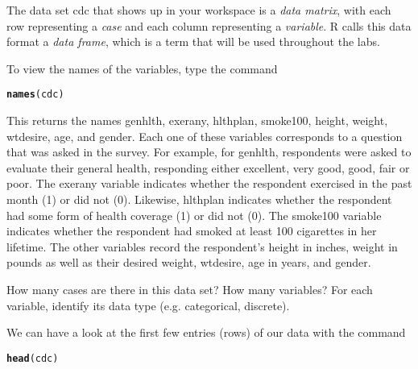 \documentclass{article}\usepackage[]{graphicx}\usepackage[]{color}
\makeatletter
\newcommand{\hlstd}[1]{\textcolor[rgb]{0.345,0.345,0.345}{#1}}%
\newcommand{\hlkwd}[1]{\textcolor[rgb]{0.737,0.353,0.396}{\textbf{#1}}}%
\newenvironment{kframe}{%
 \def\at@end@of@kframe{}%
 \ifinner\ifhmode%
  \def\at@end@of@kframe{\end{minipage}}%
  \begin{minipage}{\columnwidth}%
 \fi\fi%
 \def\FrameCommand##1{\hskip\@totalleftmargin \hskip-\fboxsep
 \colorbox{shadecolor}{##1}\hskip-\fboxsep
     \hskip-\linewidth \hskip-\@totalleftmargin \hskip\columnwidth}%
 \MakeFramed {\advance\hsize-\width
   \@totalleftmargin\z@ \linewidth\hsize
   \@setminipage}}%
 {\par\unskip\endMakeFramed%
 \at@end@of@kframe}
\newenvironment{knitrout}{}{} %
\makeatother
\begin{document}
The data set \hlstd{cdc} that shows up in your workspace is a \emph{data matrix}, with each row representing a \emph{case} and each column representing a \emph{variable}.  R calls this data format a \emph{data frame}, which is a term that will be used throughout the labs.

To view the names of the variables, type the command

\begin{knitrout}
\color{fgcolor}\begin{kframe}
\begin{alltt}
\hlkwd{names}\hlstd{(cdc)}
\end{alltt}
\end{kframe}
\end{knitrout}

This returns the names \hlstd{genhlth}, \hlstd{exerany}, \hlstd{hlthplan}, \hlstd{smoke100}, \hlstd{height}, \hlstd{weight}, \hlstd{wtdesire}, \hlstd{age}, and \hlstd{gender}. Each one of these variables corresponds to a question that was asked in the survey.  For example, for \hlstd{genhlth}, respondents were asked to evaluate their general health, responding either excellent, very good, good, fair or poor. The \hlstd{exerany} variable indicates whether the respondent exercised in the past month (1) or did not (0). Likewise, \hlstd{hlthplan} indicates whether the respondent had some form of health coverage (1) or did not (0). The \hlstd{smoke100} variable indicates whether the respondent had smoked at least 100 cigarettes in her lifetime. The other variables record the respondent's \hlstd{height} in inches, \hlstd{weight} in pounds as well as their desired weight, \hlstd{wtdesire}, \hlstd{age} in years, and \hlstd{gender}.

\begin{exercise}
How many cases are there in this data set?  How many variables?  For each variable, identify its data type (e.g. categorical, discrete).
\end{exercise}

We can have a look at the first few entries (rows) of our data with the command

\begin{knitrout}
\color{fgcolor}\begin{kframe}
\begin{alltt}
\hlkwd{head}\hlstd{(cdc)}
\end{alltt}
\end{kframe}
\end{knitrout}
\end{document}
